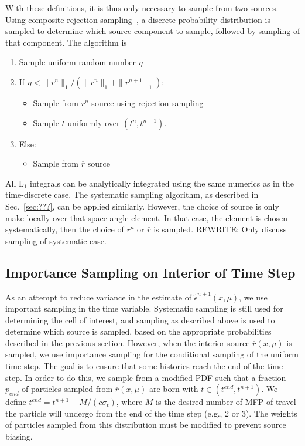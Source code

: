 With these definitions, it is thus only necessary to sample from two sources.  Using
composite-rejection sampling~\cite{shultis_mc}, a discrete probability distribution is
sampled to determine which source component to sample, followed by sampling of that
component.  The algorithm is
\begin{enumerate}
    \item Sample uniform random number $\eta$
    \item If $\eta < \|r^{n}\|_1/(\|r^{n}\|_1 + \|r^{n+1}\|_1)$:
    \begin{itemize}
        \item Sample from $r^{n}$ source using rejection sampling
        \item Sample $t$ uniformly over $(t^{n},t^{n+1})$.
    \end{itemize}
\item Else:
    \begin{itemize}
        \item Sample from $\overline r$ source
    \end{itemize}
\end{enumerate}
All L$_1$ integrals can be analytically integrated using the same numerics as in the
time-discrete case.  The systematic sampling algorithm, as described in
Sec.~\ref{sec:???}, can be applied similarly.  However, the choice of source is only make
locally over that space-angle element. In that case, the element is chosen systematically,
then the choice of $r^{n}$ or $\overline r$ is sampled.
REWRITE: Only discuss sampling of systematic case.

\subsection{Importance Sampling on Interior of Time Step}

As an attempt to reduce variance in the estimate of $\tilde \epsilon^{n+1}(x,\mu)$, we use
important sampling in the time variable.  Systematic sampling is still used for
determining the cell of interest, and sampling as described above is used to determine
which source is sampled, based on the appropriate probabilities described in the previous
section.  However, when the interior source $\overline r(x,\mu)$ is sampled, we use
importance sampling for the conditional sampling of the uniform time step.  The goal is to ensure that some
histories reach the end of the time step.  In order to do this, we sample from a modified
PDF such that a fraction $p_{end}$ of particles sampled from $\overline r(x,\mu)$ are born
with $t\in(t^{end},t^{n+1})$.  We define $t^{end}=t^{n+1}-M/(c\sigma_t)$, where $M$ is the desired
number of MFP of travel the particle will undergo from the end of
the time step (e.g., 2 or 3).  The weights of particles sampled from this
distribution must be modified to prevent source biasing.

